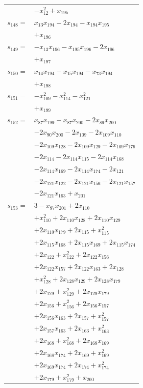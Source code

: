 \begin{longtable}{@{}r@{\;}l@{}}
 & \(\displaystyle -x_{12}^{2} +x_{195}\) \\[3pt]
\(s_{148}=\) & \(\displaystyle x_{13}x_{194} +2x_{194} -x_{194}x_{195}\) \\
 & \(\displaystyle +x_{196}\) \\[3pt]
\(s_{149}=\) & \(\displaystyle -x_{13}x_{196} -x_{195}x_{196} -2x_{196}\) \\
 & \(\displaystyle +x_{197}\) \\[3pt]
\(s_{150}=\) & \(\displaystyle x_{14}x_{194} -x_{15}x_{194} -x_{73}x_{194}\) \\
 & \(\displaystyle +x_{198}\) \\[3pt]
\(s_{151}=\) & \(\displaystyle -x_{109}^{2} -x_{114}^{2} -x_{121}^{2}\) \\
 & \(\displaystyle +x_{199}\) \\[3pt]
\(s_{152}=\) & \(\displaystyle x_{87}x_{199} +x_{87}x_{200} -2x_{89}x_{200}\) \\
 & \(\displaystyle -2x_{90}x_{200} -2x_{109} -2x_{109}x_{110}\) \\
 & \(\displaystyle -2x_{109}x_{128} -2x_{109}x_{129} -2x_{109}x_{179}\) \\
 & \(\displaystyle -2x_{114} -2x_{114}x_{115} -2x_{114}x_{168}\) \\
 & \(\displaystyle -2x_{114}x_{169} -2x_{114}x_{174} -2x_{121}\) \\
 & \(\displaystyle -2x_{121}x_{122} -2x_{121}x_{156} -2x_{121}x_{157}\) \\
 & \(\displaystyle -2x_{121}x_{163} +x_{201}\) \\[3pt]
\(s_{153}=\) & \(\displaystyle 3 -x_{87}x_{201} +2x_{110}\) \\
 & \(\displaystyle +x_{110}^{2} +2x_{110}x_{128} +2x_{110}x_{129}\) \\
 & \(\displaystyle +2x_{110}x_{179} +2x_{115} +x_{115}^{2}\) \\
 & \(\displaystyle +2x_{115}x_{168} +2x_{115}x_{169} +2x_{115}x_{174}\) \\
 & \(\displaystyle +2x_{122} +x_{122}^{2} +2x_{122}x_{156}\) \\
 & \(\displaystyle +2x_{122}x_{157} +2x_{122}x_{163} +2x_{128}\) \\
 & \(\displaystyle +x_{128}^{2} +2x_{128}x_{129} +2x_{128}x_{179}\) \\
 & \(\displaystyle +2x_{129} +x_{129}^{2} +2x_{129}x_{179}\) \\
 & \(\displaystyle +2x_{156} +x_{156}^{2} +2x_{156}x_{157}\) \\
 & \(\displaystyle +2x_{156}x_{163} +2x_{157} +x_{157}^{2}\) \\
 & \(\displaystyle +2x_{157}x_{163} +2x_{163} +x_{163}^{2}\) \\
 & \(\displaystyle +2x_{168} +x_{168}^{2} +2x_{168}x_{169}\) \\
 & \(\displaystyle +2x_{168}x_{174} +2x_{169} +x_{169}^{2}\) \\
 & \(\displaystyle +2x_{169}x_{174} +2x_{174} +x_{174}^{2}\) \\
 & \(\displaystyle +2x_{179} +x_{179}^{2} +x_{200}\) \\[3pt]
\end{longtable}
\endgroup
